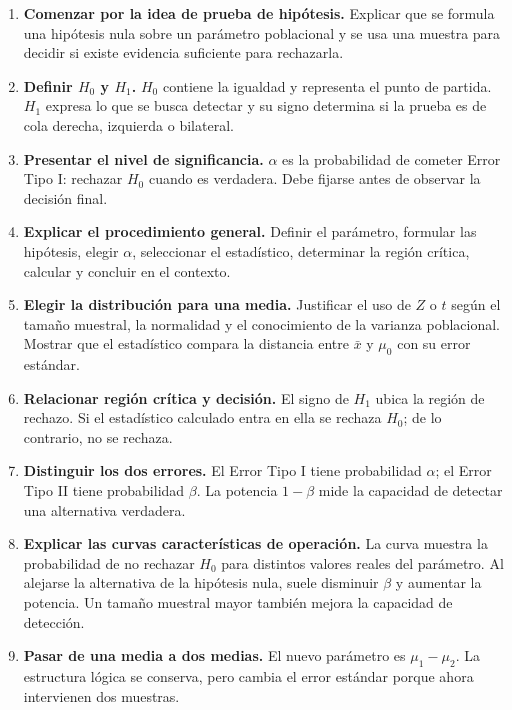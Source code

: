 \documentclass[11pt,a4paper]{article}
\newcommand{\Hcero}{H_0}
\newcommand{\Huno}{H_1}
\begin{document}
\begin{enumerate}[label=\textbf{\arabic*.},leftmargin=2em]
\item \textbf{Comenzar por la idea de prueba de hipótesis.} Explicar que se formula una hipótesis nula sobre un parámetro poblacional y se usa una muestra para decidir si existe evidencia suficiente para rechazarla.

\item \textbf{Definir $\Hcero$ y $\Huno$.} $\Hcero$ contiene la igualdad y representa el punto de partida. $\Huno$ expresa lo que se busca detectar y su signo determina si la prueba es de cola derecha, izquierda o bilateral.

\item \textbf{Presentar el nivel de significancia.} $\alpha$ es la probabilidad de cometer Error Tipo I: rechazar $\Hcero$ cuando es verdadera. Debe fijarse antes de observar la decisión final.

\item \textbf{Explicar el procedimiento general.} Definir el parámetro, formular las hipótesis, elegir $\alpha$, seleccionar el estadístico, determinar la región crítica, calcular y concluir en el contexto.

\item \textbf{Elegir la distribución para una media.} Justificar el uso de $Z$ o $t$ según el tamaño muestral, la normalidad y el conocimiento de la varianza poblacional. Mostrar que el estadístico compara la distancia entre $\bar x$ y $\mu_0$ con su error estándar.

\item \textbf{Relacionar región crítica y decisión.} El signo de $\Huno$ ubica la región de rechazo. Si el estadístico calculado entra en ella se rechaza $\Hcero$; de lo contrario, no se rechaza.

\item \textbf{Distinguir los dos errores.} El Error Tipo I tiene probabilidad $\alpha$; el Error Tipo II tiene probabilidad $\beta$. La potencia $1-\beta$ mide la capacidad de detectar una alternativa verdadera.

\item \textbf{Explicar las curvas características de operación.} La curva muestra la probabilidad de no rechazar $\Hcero$ para distintos valores reales del parámetro. Al alejarse la alternativa de la hipótesis nula, suele disminuir $\beta$ y aumentar la potencia. Un tamaño muestral mayor también mejora la capacidad de detección.

\item \textbf{Pasar de una media a dos medias.} El nuevo parámetro es $\mu_1-\mu_2$. La estructura lógica se conserva, pero cambia el error estándar porque ahora intervienen dos muestras.


\end{enumerate}
\end{document}
